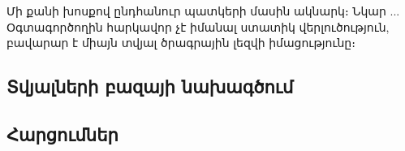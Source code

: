 {
	Մի քանի խոսքով ընդհանուր պատկերի մասին ակնարկ։ Նկար ...
	Օգտագործողին հարկավոր չէ իմանալ ստատիկ վերլուծություն, բավարար է միայն տվյալ ծրագրային լեզվի իմացությունը։

	\subsection{Տվյալների բազայի նախագծում}
	

	\subsection{Հարցումներ}
	
}

